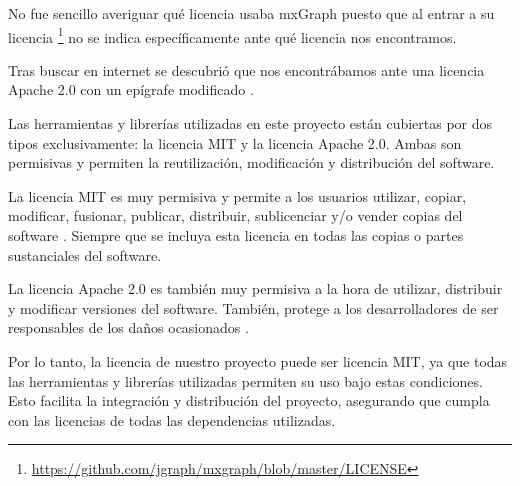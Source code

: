 No fue sencillo averiguar qué licencia usaba mxGraph puesto que al entrar a su licencia \footnote{\url{https://github.com/jgraph/mxgraph/blob/master/LICENSE}} no se indica específicamente ante qué licencia nos encontramos.

Tras buscar en internet se descubrió que nos encontrábamos ante una licencia Apache 2.0 \cite{jgraph_issue29} con un epígrafe modificado \cite{jgraph_issue505}.

Las herramientas y librerías utilizadas en este proyecto están cubiertas por dos tipos exclusivamente: la licencia MIT\cite{mit:license} y la licencia Apache 2.0\cite{apache:license}. Ambas son permisivas y permiten la reutilización, modificación y distribución del software.

La licencia MIT es muy permisiva y permite a los usuarios utilizar, copiar, modificar, fusionar, publicar, distribuir, sublicenciar y/o vender copias del software \cite{sistemasoperativos:mit}. Siempre que se incluya esta licencia en todas las copias o partes sustanciales del software.

La licencia Apache 2.0 es también muy permisiva a la hora de utilizar, distribuir y modificar versiones del software. También, protege a los desarrolladores de ser responsables de los daños ocasionados \cite{sistemasoperativos:apache}.

Por lo tanto, la licencia de nuestro proyecto puede ser licencia MIT, ya que todas las herramientas y librerías utilizadas permiten su uso bajo estas condiciones. Esto facilita la integración y distribución del proyecto, asegurando que cumpla con las licencias de todas las dependencias utilizadas.
